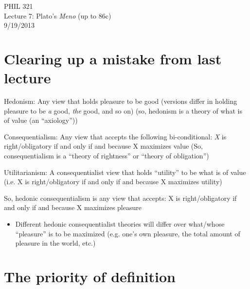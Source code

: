 \documentclass[11pt]{article}
\begin{document}
\thispagestyle{empty}
\begin{center} \LARGE{PHIL 321\\ Lecture 7: Plato's \emph{Meno} (up to 86c)}\\ \vspace*{2mm}
\large{9/19/2013}\end{center}
\thispagestyle{empty}\vspace*{3mm}
\vspace*{-8mm}

\section*{Clearing up a mistake from last lecture}

\noindent Hedonism: Any view that holds pleasure to be good (versions differ in holding pleasure to be \emph{a} good, \emph{the} good, and so on) (so, hedonism is a theory of what is of value (an ``axiology''))
\vspace*{2mm} 

\noindent Consequentialism: Any view that accepts the following bi-conditional: \emph{X} is right/obligatory if and only if and because X maximizes value (So, consequentialism is a ``theory of rightness'' or ``theory of obligation'')
\vspace*{2mm}

\noindent Utilitarianism: A consequentialist view that holds ``utility'' to be what is of value (i.e. X is right/obligatory if and only if and because X maximizes utility)
\vspace*{2mm}

\noindent So, hedonic consequentialism is any view that accepts: X is right/obligatory if and only if and because X maximizes pleasure

\begin{itemize}\item{Different hedonic consequentialist theories will differ over what/whose ``pleasure'' is to be maximized (e.g. one's own pleasure, the total amount of pleasure in the world, etc.)}\end{itemize}

\section*{The priority of definition}
\end{document}
